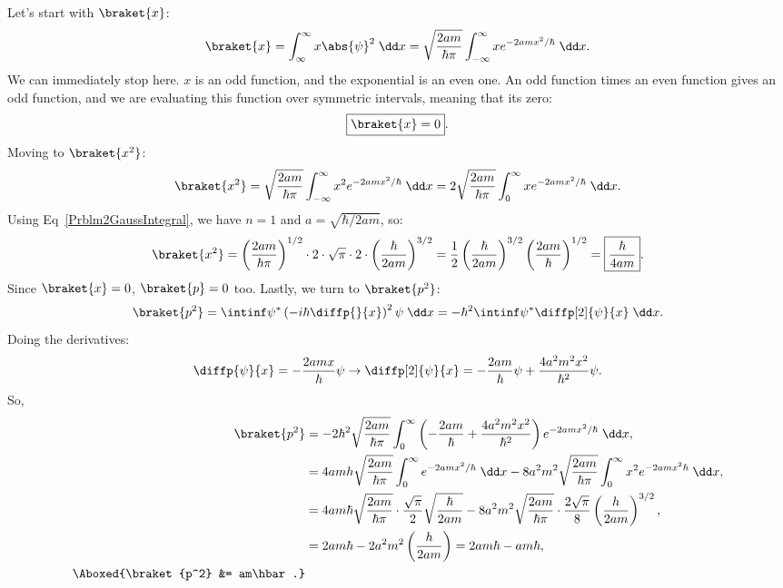 \begin{parts}
    \item Let's start with $\braket{x}$:
        \begin{equation*}
            \braket{x} = \int_{\infty}^{\infty} x\abs{\psi}^2 \;\dd x = \sqrt{\frac{2am}{\hbar\pi}} \int_{-\infty}^{\infty} xe^{-2amx^2/\hbar} \;\dd x.
        \end{equation*}
        We can immediately stop here. $x$ is an odd function, and the exponential is an even one. An odd function times an even function gives an odd function, and we are evaluating this function over symmetric intervals, meaning that its zero:
        \begin{equation*}
            \boxed{\braket{x} = 0}.
        \end{equation*}
        Moving to $\braket{x^2}$:
        \begin{equation*}
            \braket{x^2} = \sqrt{\frac{2am}{\hbar\pi}} \int_{-\infty}^{\infty} x^2 e^{-2amx^2/\hbar} \;\dd x = 2\sqrt{\frac{2am}{\hbar\pi}} \int_0^{\infty} xe^{-2amx^2/\hbar} \;\dd x.
        \end{equation*}
        Using Eq~\eqref{Prblm2GaussIntegral}, we have $n=1$ and $a=\sqrt{\hbar/2am}$, so:
        \begin{equation*}
            \braket{x^2} = \left(\frac{2am}{\hbar\pi}\right)^{1/2} \cdot 2 \cdot \sqrt{\pi} \cdot 2 \cdot \left(\frac{\hbar}{2am}\right)^{3/2} = \frac{1}{2}\left(\frac{\hbar}{2am}\right)^{3/2}\left(\frac{2am}{\hbar}\right)^{1/2} = \boxed{\frac{\hbar}{4am}}.
        \end{equation*}
        Since $\braket{x} = 0$, $\braket{p} = 0$ too.
        Lastly, we turn to $\braket{p^2}$:
        \begin{equation*}
            \braket{p^2} = \intinf \psi^* \left(-i\hbar \diffp{}{x}\right)^2 \psi \;\dd x = -\hbar^2 \intinf \psi^* \diffp[2]{\psi}{x} \;\dd x.
        \end{equation*}
        Doing the derivatives:
        \begin{equation*}
            \diffp{\psi}{x} = -\frac{2amx}{\hbar}\psi \rightarrow \diffp[2]{\psi}{x} = -\frac{2am}{\hbar}\psi + \frac{4a^2m^2x^2}{\hbar^2}\psi.
        \end{equation*}
        So,
        \begin{align*}
            \braket{p^2} &= -2\hbar^2 \sqrt{\frac{2am}{\hbar\pi}} \int_0^{\infty} \left(-\frac{2am}{\hbar} + \frac{4a^2m^2x^2}{\hbar^2}\right)e^{-2amx^2/\hbar} \;\dd x, \\
            &= 4amh\sqrt{\frac{2am}{\hbar\pi}} \int_0^{\infty} e^{-2amx^2/\hbar} \;\dd x -8a^2m^2\sqrt{\frac{2am}{\hbar\pi}} \int_0^{\infty} x^2 e^{-2amx^2\hbar} \;\dd x, \\
            &= 4am\hbar \sqrt{\frac{2am}{\hbar\pi}} \cdot \frac{\sqrt{\pi}}{2}\sqrt{\frac{\hbar}{2am}} - 8a^2m^2\sqrt{\frac{2am}{\hbar\pi}} \cdot \frac{2\sqrt{\pi}}{8} \left(\frac{h}{2am}\right)^{3/2}, \\
            &=2am\hbar - 2a^2m^2 \left(\frac{h}{2am}\right) = 2am\hbar - am\hbar, \\
            \Aboxed{\braket{p^2} &= am\hbar.}
        \end{align*}
    

\end{parts}
